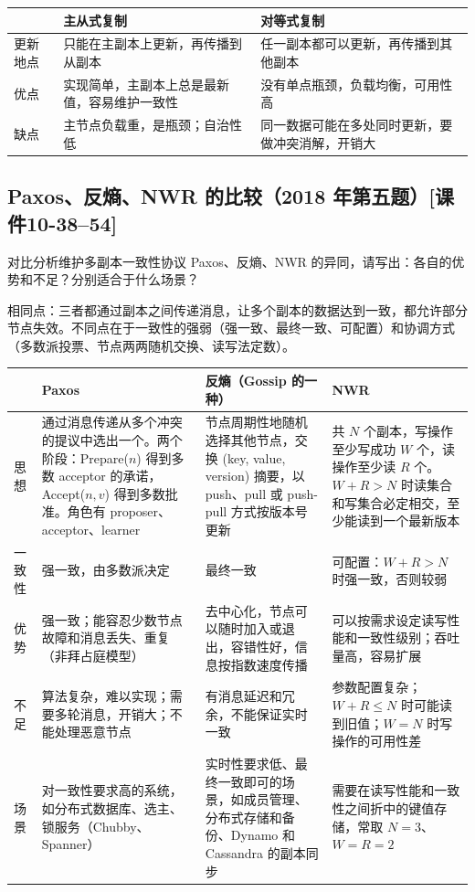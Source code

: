 \documentclass[10pt,a4paper]{article}
\newcommand{\kj}[1]{\textsf{\small[课件#1]}}
\newenvironment{keep}{\par\noindent\begin{minipage}{\linewidth}\setlength{\parskip}{3pt plus 1pt}}{\end{minipage}\par\vspace{2pt}}
\begin{document}
{\small
\begin{tabularx}{\linewidth}{@{}l X X@{}}
\toprule
 & 主从式复制 & 对等式复制\\ \midrule
更新地点 & 只能在主副本上更新，再传播到从副本 & 任一副本都可以更新，再传播到其他副本 \\
优点 & 实现简单，主副本上总是最新值，容易维护一致性 & 没有单点瓶颈，负载均衡，可用性高 \\
缺点 & 主节点负载重，是瓶颈；自治性低 & 同一数据可能在多处同时更新，要做冲突消解，开销大 \\
\bottomrule
\end{tabularx}}

\subsection{Paxos、反熵、NWR 的比较（2018 年第五题）\kj{10-38--54}}\label{s:paxos}
\begin{keep}
\begin{prob}[原题]
对比分析维护多副本一致性协议 Paxos、反熵、NWR 的异同，请写出：各自的优势和不足？分别适合于什么场景？
\end{prob}
\begin{ans}[2018 年第五题]
相同点：三者都通过副本之间传递消息，让多个副本的数据达到一致，都允许部分节点失效。不同点在于一致性的强弱（强一致、最终一致、可配置）和协调方式（多数派投票、节点两两随机交换、读写法定数）。\\[2pt]
{\small
\begin{tabularx}{\linewidth}{@{}l X X X@{}}
\toprule
 & Paxos & 反熵（Gossip 的一种） & NWR \\ \midrule
思想 & 通过消息传递从多个冲突的提议中选出一个。两个阶段：Prepare($n$) 得到多数 acceptor 的承诺，Accept($n,v$) 得到多数批准。角色有 proposer、acceptor、learner & 节点周期性地随机选择其他节点，交换 (key, value, version) 摘要，以 push、pull 或 push-pull 方式按版本号更新 & 共 $N$ 个副本，写操作至少写成功 $W$ 个，读操作至少读 $R$ 个。$W+R>N$ 时读集合和写集合必定相交，至少能读到一个最新版本 \\
一致性 & 强一致，由多数派决定 & 最终一致 & 可配置：$W+R>N$ 时强一致，否则较弱 \\
优势 & 强一致；能容忍少数节点故障和消息丢失、重复（非拜占庭模型） & 去中心化，节点可以随时加入或退出，容错性好，信息按指数速度传播 & 可以按需求设定读写性能和一致性级别；吞吐量高，容易扩展 \\
不足 & 算法复杂，难以实现；需要多轮消息，开销大；不能处理恶意节点 & 有消息延迟和冗余，不能保证实时一致 & 参数配置复杂；$W+R\le N$ 时可能读到旧值；$W=N$ 时写操作的可用性差 \\
场景 & 对一致性要求高的系统，如分布式数据库、选主、锁服务（Chubby、Spanner） & 实时性要求低、最终一致即可的场景，如成员管理、分布式存储和备份、Dynamo 和 Cassandra 的副本同步 & 需要在读写性能和一致性之间折中的键值存储，常取 $N=3$、$W=R=2$ \\
\bottomrule
\end{tabularx}}
\end{ans}
\end{keep}
\end{document}
